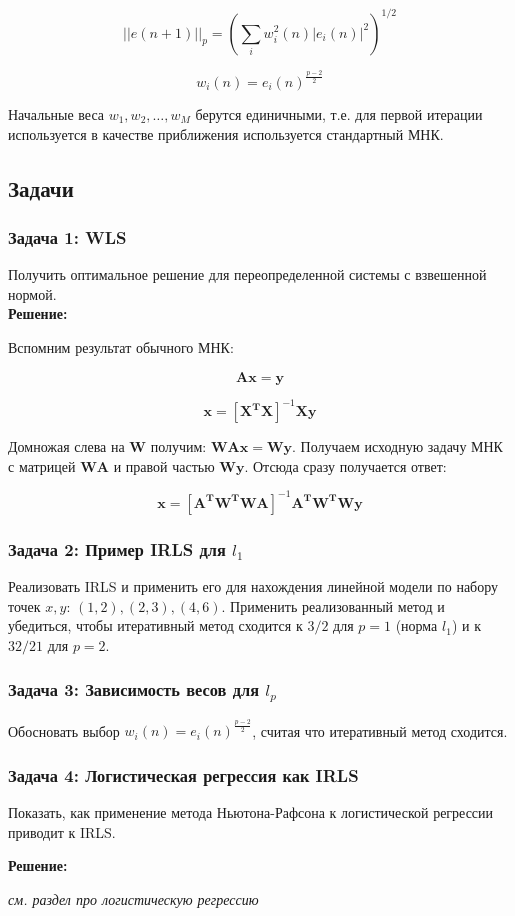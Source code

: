 \[
||e(n +1)||_p = \left( \sum_i w_i^2(n) |e_i(n)|^2 \right)^{1/2}
\]

\[
w_i(n) = e_i(n)^{\frac{p - 2}{2}}
\]

Начальные веса $w_1, w_2, \dots, w_M$ берутся единичными, т.е. для первой итерации используется в качестве приближения используется стандартный МНК.

\subsection{Задачи}

\subsubsection{Задача 1: WLS}

Получить оптимальное решение для переопределенной системы с взвешенной нормой. \\

\textbf{Решение:}

Вспомним результат обычного МНК:

\[
    \boldsymbol{A} \boldsymbol{x} = \boldsymbol{y}
\]

\[
    \boldsymbol{x} = \left[\boldsymbol{X^T X}\right]^{-1} \boldsymbol{X y}
\]

Домножая слева на $\boldsymbol{W}$ получим: $\boldsymbol{W} \boldsymbol{A} \boldsymbol{x} = \boldsymbol{W} \boldsymbol{y}$. Получаем исходную задачу МНК с матрицей $\boldsymbol{W} \boldsymbol{A}$ и правой частью $\boldsymbol{W} \boldsymbol{y}$. Отсюда сразу получается ответ:

\[
    \boldsymbol{x} = \left[ \boldsymbol{A^T W^T W A} \right]^{-1} \boldsymbol{A^T W^T W y}
\]

\subsubsection{Задача 2: Пример IRLS для $l_1$}

Реализовать IRLS и применить его для нахождения линейной модели по набору точек $x, y$: $(1, 2), (2, 3), (4, 6)$. Применить реализованный метод и убедиться, чтобы итеративный метод сходится к $3 / 2$ для $p = 1$ (норма $l_1$) и к $32 / 21$ для $p = 2$.

\subsubsection{Задача 3: Зависимость весов для $l_p$}

Обосновать выбор $w_i(n) = e_i(n)^{\frac{p - 2}{2}}$, считая что итеративный метод сходится.

\subsubsection{Задача 4: Логистическая регрессия как IRLS}

Показать, как применение метода Ньютона-Рафсона к логистической регрессии приводит к IRLS.

\textbf{Решение:}

\textit{см. раздел про логистическую регрессию}
